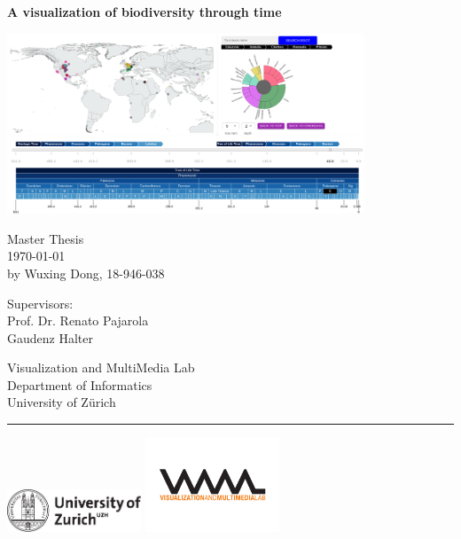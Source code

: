 \documentclass[11pt, a4paper,oneside,chapterprefix=false]{scrbook}
\begin{document}
\frontmatter
\begin{titlepage}
	\setlength{\parindent}{0cm}
	\addtolength{\textheight}{1.0cm}

	\vspace{0.5cm}
	\Huge
	{\textbf{A visualization of biodiversity through time\\ }}

	\vfill \vfill \vfill
	\begin{center}
	\includegraphics*[width=0.8\textwidth]{figures/cover/cover}
    \end{center}
	\vfill
	\sf \Large
	Master Thesis \\
	\today \\[0.5cm]
	\large
	by Wuxing Dong, 18-946-038

	\vfill \vfill \vfill
	\begin{minipage}[b]{0.5\textwidth}
	Supervisors: \\
	Prof. Dr. Renato Pajarola \\
	Gaudenz Halter \\
	\end{minipage}
	\begin{minipage}[b]{0.5\textwidth} \raggedleft
	Visualization and MultiMedia Lab \\
	Department of Informatics \\
	University of Z{\"u}rich
	\end{minipage}

	\vfill
	\hrule
	\vspace{0.5cm}
	\includegraphics*[width=0.3\textwidth]{figures/cover/uzh_logo} \hfill
	\includegraphics*[width=0.3\textwidth]{figures/cover/vmml_logo}
\end{titlepage}
\end{document}
